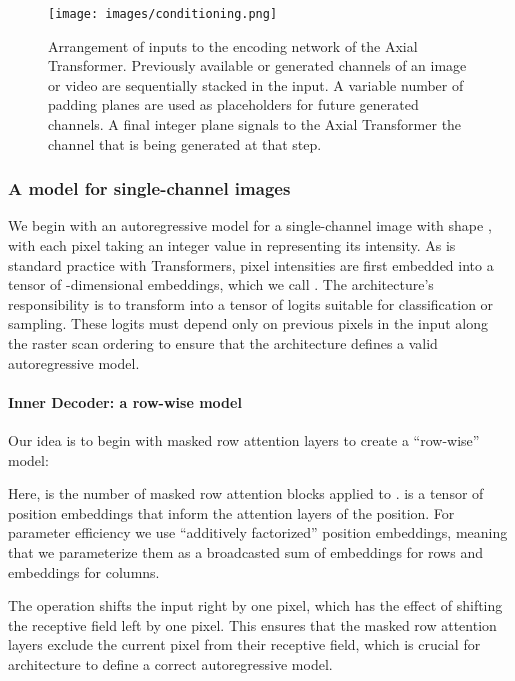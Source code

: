 \documentclass{article} \usepackage{iclr2020_conference,times}
\begin{document}
\begin{figure}[t]
     \centering
     \texttt{[image: images/conditioning.png]}
     \caption{Arrangement of inputs to the encoding network of the Axial Transformer. Previously available or generated channels of an image or video are sequentially stacked in the input. A variable number of padding planes are used as placeholders for future generated channels. A final integer plane signals to the Axial Transformer the channel that is being generated at that step.}
     \label{fig:encoder_conditioning}
\end{figure}

\subsubsection{A model for single-channel images}

We begin with an autoregressive model for a single-channel image  with shape , with each pixel taking an integer value in  representing its intensity. As is standard practice with Transformers, pixel intensities are first embedded into a  tensor of -dimensional embeddings, which we call . The architecture's responsibility is to transform  into a  tensor of logits suitable for classification or sampling. These logits must depend only on previous pixels in the input  along the raster scan ordering to ensure that the architecture defines a valid autoregressive model.

\vspace{-0.5em}
\paragraph{Inner Decoder: a row-wise model}
\label{sec:rowwise}
Our idea is to begin with masked row attention layers to create a ``row-wise'' model:

Here,  is the number of masked row attention blocks applied to .  is a  tensor of position embeddings that inform the attention layers of the position. For parameter efficiency we use  ``additively factorized'' position embeddings, meaning that we parameterize them as a broadcasted sum of  embeddings for rows  and  embeddings for columns.

The operation  shifts the input right by one pixel, which has the effect of shifting the receptive field left by one pixel. This ensures that the masked row attention layers exclude the current pixel from their receptive field, which is crucial for architecture to define a correct autoregressive model.
\end{document}
